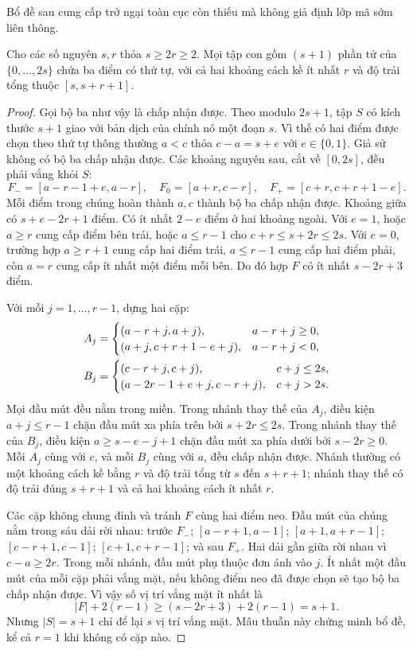 Bổ đề sau cung cấp trở ngại toàn cục còn thiếu mà không giả định lớp mã sớm liên thông.
\begin{lemma}\label{B-lem:dense}
Cho các số nguyên $s,r$ thỏa $s\geq2r\geq2$. Mọi tập con gồm $(s+1)$ phần tử của $\{0,\ldots,2s\}$ chứa ba điểm có thứ tự, với cả hai khoảng cách kề ít nhất $r$ và độ trải tổng thuộc $[s,s+r+1]$.
\end{lemma}
\begin{proof}
Gọi bộ ba như vậy là chấp nhận được. Theo modulo $2s+1$, tập $S$ có kích thước $s+1$ giao với bản dịch của chính nó một đoạn $s$. Vì thế có hai điểm được chọn theo thứ tự thông thường $a<c$ thỏa $c-a=s+e$ với $e\in\{0,1\}$. Giả sử không có bộ ba chấp nhận được. Các khoảng nguyên sau, cắt về $[0,2s]$, đều phải vắng khỏi $S$:
\begin{equation}\label{B-eq:forced}
F_-=[a-r-1+e,a-r],\quad F_0=[a+r,c-r],\quad F_+=[c+r,c+r+1-e].
\end{equation}
Mỗi điểm trong chúng hoàn thành $a,c$ thành bộ ba chấp nhận được. Khoảng giữa có $s+e-2r+1$ điểm. Có ít nhất $2-e$ điểm ở hai khoảng ngoài. Với $e=1$, hoặc $a\geq r$ cung cấp điểm bên trái, hoặc $a\leq r-1$ cho $c+r\leq s+2r\leq2s$. Với $e=0$, trường hợp $a\geq r+1$ cung cấp hai điểm trái, $a\leq r-1$ cung cấp hai điểm phải, còn $a=r$ cung cấp ít nhất một điểm mỗi bên. Do đó hợp $F$ có ít nhất $s-2r+3$ điểm.

Với mỗi $j=1,\ldots,r-1$, dựng hai cặp:
\begin{align}\label{B-eq:pairs}
A_j&=\begin{cases}(a-r+j,a+j),&a-r+j\geq0,\\(a+j,c+r+1-e+j),&a-r+j<0,\end{cases}\notag\\
B_j&=\begin{cases}(c-r+j,c+j),&c+j\leq2s,\\(a-2r-1+e+j,c-r+j),&c+j>2s.\end{cases}
\end{align}
Mọi đầu mút đều nằm trong miền. Trong nhánh thay thế của $A_j$, điều kiện $a+j\leq r-1$ chặn đầu mút xa phía trên bởi $s+2r\leq2s$. Trong nhánh thay thế của $B_j$, điều kiện $a\geq s-e-j+1$ chặn đầu mút xa phía dưới bởi $s-2r\geq0$. Mỗi $A_j$ cùng với $c$, và mỗi $B_j$ cùng với $a$, đều chấp nhận được. Nhánh thường có một khoảng cách kề bằng $r$ và độ trải tổng từ $s$ đến $s+r+1$; nhánh thay thế có độ trải đúng $s+r+1$ và cả hai khoảng cách ít nhất $r$.

Các cặp không chung đỉnh và tránh $F$ cùng hai điểm neo. Đầu mút của chúng nằm trong sáu dải rời nhau: trước $F_-$; $[a-r+1,a-1]$; $[a+1,a+r-1]$; $[c-r+1,c-1]$; $[c+1,c+r-1]$; và sau $F_+$. Hai dải gần giữa rời nhau vì $c-a\geq2r$. Trong mỗi nhánh, đầu mút phụ thuộc đơn ánh vào $j$. Ít nhất một đầu mút của mỗi cặp phải vắng mặt, nếu không điểm neo đã được chọn sẽ tạo bộ ba chấp nhận được. Vì vậy số vị trí vắng mặt ít nhất là
\begin{equation}\label{B-eq:contradiction}
|F|+2(r-1)\geq(s-2r+3)+2(r-1)=s+1.
\end{equation}
Nhưng $|S|=s+1$ chỉ để lại $s$ vị trí vắng mặt. Mâu thuẫn này chứng minh bổ đề, kể cả $r=1$ khi không có cặp nào.
\end{proof}


